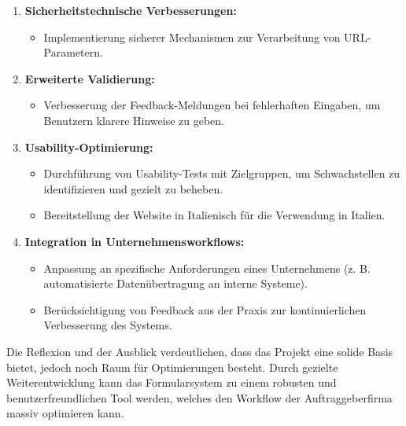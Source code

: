     \begin{enumerate}
        \item \textbf{Sicherheitstechnische Verbesserungen:}
        \begin{itemize}
            \item Implementierung sicherer Mechanismen zur Verarbeitung von URL-Parametern.
        \end{itemize}
    
        \item \textbf{Erweiterte Validierung:}
        \begin{itemize}
            \item Verbesserung der Feedback-Meldungen bei fehlerhaften Eingaben, um Benutzern klarere Hinweise zu geben.
        \end{itemize}
    
        \item \textbf{Usability-Optimierung:}
        \begin{itemize}
            \item Durchführung von Usability-Tests mit Zielgruppen, um Schwachstellen zu identifizieren und gezielt zu beheben.
            \item Bereitstellung der Website in Italienisch für die Verwendung in Italien.
        \end{itemize}
    
        \item \textbf{Integration in Unternehmensworkflows:}
        \begin{itemize}
            \item Anpassung an spezifische Anforderungen eines Unternehmens (z. B. automatisierte Datenübertragung an interne Systeme).
            \item Berücksichtigung von Feedback aus der Praxis zur kontinuierlichen Verbesserung des Systems.
        \end{itemize}
    \end{enumerate}
    
    Die Reflexion und der Ausblick verdeutlichen, dass das Projekt eine solide Basis bietet, jedoch noch Raum für Optimierungen besteht. Durch gezielte Weiterentwicklung kann das Formularsystem zu einem robusten und benutzerfreundlichen Tool werden, welches den Workflow der Auftraggeberfirma massiv optimieren kann. \cite{prompt27_pollak}